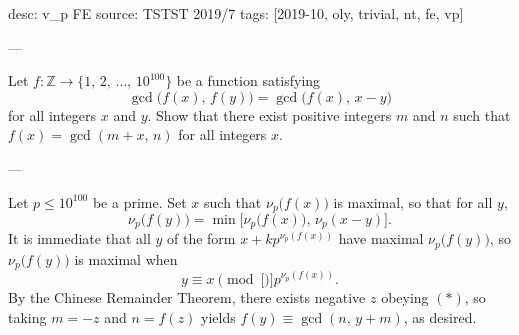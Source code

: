 desc: v_p FE
source: TSTST 2019/7
tags: [2019-10, oly, trivial, nt, fe, vp]

---

Let $f:\mathbb Z\to\{1,\,2,\,\ldots,\,10^{100}\}$ be a function satisfying \[\gcd\big(f(x),\,f(y)\big)=\gcd\big(f(x),\,x-y\big)\]
for all integers $x$ and $y$. Show that there exist positive integers $m$ and $n$ such that $f(x)=\gcd(m+x,\,n)$ for all integers $x$.

---

Let $p\le 10^{100}$ be a prime. Set $x$ such that $\nu_p\big(f(x)\big)$ is maximal, so that for all $y$, \[\nu_p\big(f(y)\big)=\min\big[\nu_p\big(f(x)\big),\,\nu_p(x-y)\big].\]
It is immediate that all $y$ of the form $x+kp^{\nu_p(f(x))}$ have maximal $\nu_p\big(f(y)\big)$, so $\nu_p\big(f(y)\big)$ is maximal when
\begin{equation}
    y\equiv x\pmod[\Big]{p^{\nu_p(f(x))}}. \tag{$*$}
\end{equation}
By the Chinese Remainder Theorem, there exists negative $z$ obeying $(*)$, so taking $m=-z$ and $n=f(z)$ yields $f(y)\equiv\gcd(n,\,y+m)$, as desired.
